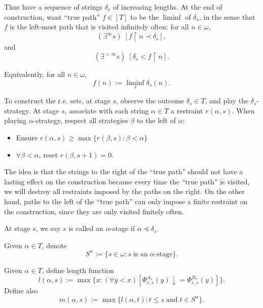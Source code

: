   Thus have a sequence of strings $\delta_s$ of increasing lengths. At the
  end of construction, want ``true path'' $f\in[T]$ to be the $\liminf$ of
  $\delta_s$, in the sense that $f$ is the left-most path that is visited
  infinitely often: for all $n\in\omega$,
  \[(\exists^\infty s)\; [f\restriction n \prec
  \delta_s],\]
  and
  \[(\exists^{<\infty} s)\; [\delta_s < f\restriction n].\]

  Equivalently, for all $n\in\omega$,
  \[f(n) :=\liminf_s \delta_s(n).\]

  To construct the r.e. sets, at stage $s$, observe the outcome
  $\delta_s\in T$, and play the $\delta_s$-strategy. At stage $s$,
  associate with each string $\alpha\in T$ a restraint $r(\alpha,s)$.
  When playing $\alpha$-strategy, respect all strategies $\beta$ to the
  left of $\alpha$:
  \begin{itemize}
    \item Ensure $r(\alpha,s) \geq \max\{r(\beta,s): \beta<\alpha\}$
    \item $\forall\beta<\alpha$, reset $r(\beta,s+1)=0$.
  \end{itemize}

  The idea is that the strings to the right of the ``true path'' should not
  have a lasting effect on the construction because every time the ``true
  path'' is visited, we will destroy all restraints imposed by the paths on
  the right. On the other hand, paths to the left of the ``true path'' can
  only impose a finite restraint on the construction, since they are only
  visited finitely often. \\

  \begin{definition}
    At stage $s$, we say $s$ is called an $\alpha$-stage if
    $\alpha\preceq\delta_s$.
  \end{definition}

  \begin{definition}
    Given $\alpha\in T$, denote
    \[S^\alpha := \{s\in\omega: s\; \text{is an}\; \alpha\text{-stage}\}.\]
  \end{definition}

  \begin{definition}
    Given $\alpha\in T$, define length function
    \[l(\alpha,s) := \max\{x: (\forall y<x) [\Phi_{e,s}^{A_s}(y)
      \downarrow =\Phi_{e,s}^{B_s}(y)]\}.\]
    Define also
    \[m(\alpha,s) := \max\{l(\alpha,t): t\leq s\; \text{and}\; t\in
    S^{\alpha}\}.\]
  \end{definition}


